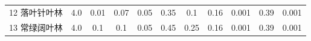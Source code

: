 \begin{landscape}
\begin{table}[htbp]
\begin{tabular}{@{}lcccccccccc@{}}
    12 落叶针叶林       & 4.0        & \num{ 0.01  }                                                                       & 0.07                                                                                                            & 0.05                                                                                                            & 0.35                                                                                                            & 0.1                                                                                                             & 0.16                                                                                                            & 0.001                                                                                                           & 0.39                                                                                                            & 0.001                                                                                                           \\ %
%
        13 常绿阔叶林   & 4.0        & \num { 0.1   }                                                                       & 0.1                                                                                                             & 0.05                                                                                                            & 0.45                                                                                                            & 0.25                                                                                                            & 0.16                                                                                                            & 0.001                                                                                                           & 0.39                                                                                                            & 0.001                                                                                                           \\

\end{tabular}
\end{table}
\end{landscape}
